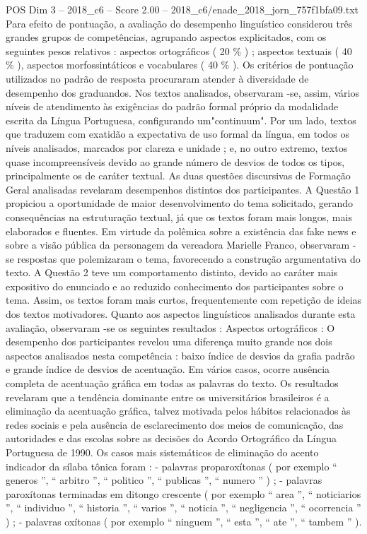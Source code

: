 \begin{textsample}{POS Dim 3 – 2018\_c6 – Score 2.00 – 2018\_c6/enade\_2018\_jorn\_757f1bfa09.txt}
Para efeito de pontuação, a avaliação do desempenho linguístico considerou três grandes grupos de competências, agrupando aspectos explicitados, com os seguintes pesos relativos : aspectos ortográficos ( 20 \% ) ; aspectos textuais ( 40 \% ), aspectos morfossintáticos e vocabulares ( 40 \% ).
Os critérios de pontuação utilizados no padrão de resposta procuraram atender à diversidade de desempenho dos graduandos.
Nos textos analisados, observaram -se, assim, vários níveis de atendimento às exigências do padrão formal próprio da modalidade escrita da Língua Portuguesa, configurando um"continuum".
Por um lado, textos que traduzem com exatidão a expectativa de uso formal da língua, em todos os níveis analisados, marcados por clareza e unidade ; e, no outro extremo, textos quase incompreensíveis devido ao grande número de desvios de todos os tipos, principalmente os de caráter textual.
As duas questões discursivas de Formação Geral analisadas revelaram desempenhos distintos dos participantes.
A Questão 1 propiciou a oportunidade de maior desenvolvimento do tema solicitado, gerando consequências na estruturação textual, já que os textos foram mais longos, mais elaborados e fluentes.
Em virtude da polêmica sobre a existência das fake news e sobre a visão pública da personagem da vereadora Marielle Franco, observaram -se respostas que polemizaram o tema, favorecendo a construção argumentativa do texto.
A Questão 2 teve um comportamento distinto, devido ao caráter mais expositivo do enunciado e ao reduzido conhecimento dos participantes sobre o tema.
Assim, os textos foram mais curtos, frequentemente com repetição de ideias dos textos motivadores.
Quanto aos aspectos linguísticos analisados durante esta avaliação, observaram -se os seguintes resultados : Aspectos ortográficos : O desempenho dos participantes revelou uma diferença muito grande nos dois aspectos analisados nesta competência : baixo índice de desvios da grafia padrão e grande índice de desvios de acentuação.
Em vários casos, ocorre ausência completa de acentuação gráfica em todas as palavras do texto.
Os resultados revelaram que a tendência dominante entre os universitários brasileiros é a eliminação da acentuação gráfica, talvez motivada pelos hábitos relacionados às redes sociais e pela ausência de esclarecimento dos meios de comunicação, das autoridades e das escolas sobre as decisões do Acordo Ortográfico da Língua Portuguesa de 1990.
Os casos mais sistemáticos de eliminação do acento indicador da sílaba tônica foram : - palavras proparoxítonas ( por exemplo “ generos ”, “ arbitro ”, “ politico ”, “ publicas ”, “ numero ” ) ; - palavras paroxítonas terminadas em ditongo crescente ( por exemplo “ area ”, “ noticiarios ”, “ individuo ”, “ historia ”, “ varios ”, “ noticia ”, “ negligencia ”, “ ocorrencia ” ) ; - palavras oxítonas ( por exemplo “ ninguem ”, “ esta ”, “ ate ”, “ tambem ” ).

\end{textsample}
